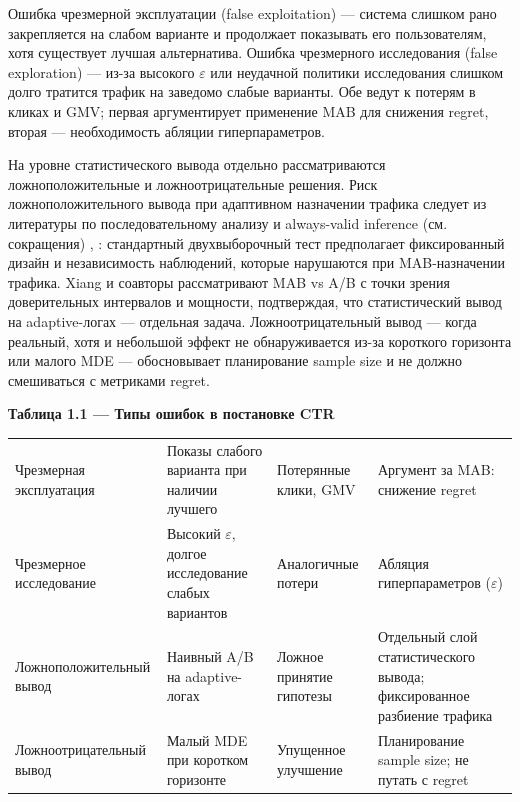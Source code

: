 Ошибка чрезмерной эксплуатации (false exploitation) --- система слишком рано закрепляется на слабом варианте и продолжает показывать его пользователям, хотя существует лучшая альтернатива. Ошибка чрезмерного исследования (false exploration) --- из-за высокого $\varepsilon$ или неудачной политики исследования слишком долго тратится трафик на заведомо слабые варианты. Обе ведут к потерям в кликах и GMV; первая аргументирует применение MAB для снижения regret, вторая --- необходимость абляции гиперпараметров.

На уровне статистического вывода отдельно рассматриваются ложноположительные и ложноотрицательные решения. Риск ложноположительного вывода при адаптивном назначении трафика следует из литературы по последовательному анализу и always-valid inference (см. сокращения) \cite{ref19}, \cite{ref20}: стандартный двухвыборочный тест предполагает фиксированный дизайн и независимость наблюдений, которые нарушаются при MAB-назначении трафика. Xiang и соавторы \cite{ref21} рассматривают MAB vs A/B с точки зрения доверительных интервалов и мощности, подтверждая, что статистический вывод на adaptive-логах --- отдельная задача. Ложноотрицательный вывод --- когда реальный, хотя и небольшой эффект не обнаруживается из-за короткого горизонта или малого MDE --- обосновывает планирование sample size \cite{ref5} и не должно смешиваться с метриками regret.

\textbf{Таблица 1.1 --- Типы ошибок в постановке CTR}

\begingroup\footnotesize\setlength{\tabcolsep}{4pt}
\begin{xltabular}{\linewidth}{@{}
  >{\raggedright\arraybackslash}Y
  >{\raggedright\arraybackslash}Y
  >{\raggedright\arraybackslash}Y
  >{\raggedright\arraybackslash}Y@{}}
\toprule\noalign{}
\midrule\noalign{}
\endhead
\bottomrule\noalign{}
\endlastfoot
Чрезмерная эксплуатация & Показы слабого варианта при наличии лучшего & Потерянные клики, GMV & Аргумент за MAB: снижение regret \\
Чрезмерное исследование & Высокий $\varepsilon$, долгое исследование слабых вариантов & Аналогичные потери & Абляция гиперпараметров ($\varepsilon$) \\
Ложноположительный вывод & Наивный A/B на adaptive-логах & Ложное принятие гипотезы & Отдельный слой статистического вывода; фиксированное разбиение трафика \\
Ложноотрицательный вывод & Малый MDE при коротком горизонте & Упущенное улучшение & Планирование sample size; не путать с regret \\
\end{xltabular}
\endgroup

